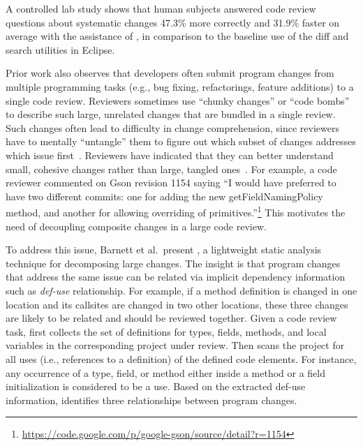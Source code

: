 \documentclass[11pt]{article}
\begin{document}

A controlled lab study shows that human subjects answered code review questions about systematic changes 47.3\% more correctly and 31.9\% faster on average with the assistance of {\critics}, in comparison to the baseline use of the diff and search utilities in Eclipse.

Prior work also observes that developers often submit program changes from multiple programming tasks (e.g., bug fixing, refactorings, feature additions) to a single code review. Reviewers sometimes use ``chunky changes'' or ``code bombs'' to describe such large, unrelated changes that are bundled in a single review. Such changes often lead to difficulty in change comprehension, since reviewers have to mentally ``untangle'' them to figure out which subset of changes addresses which issue first~\cite{kawrykow2011non, murphy2012we, herzig2013impact}. Reviewers have indicated that they can better understand small, cohesive changes rather than large, tangled ones~\cite{rigby2008open}. For example, a code reviewer commented on Gson revision 1154 saying ``I would have preferred to have two different commits: one for adding the new {\ttt getFieldNamingPolicy} method, and another for allowing overriding of primitives.''\footnote{\url{https://code.google.com/p/google-gson/source/detail?r=1154}} This motivates the need of decoupling composite changes in a large code review. 

To address this issue, Barnett et al.~present {\clusterchanges}, a lightweight static analysis technique for decomposing large changes. The insight is that program changes that address the same issue can be related via implicit dependency information such as {\em def-use} relationship. For example, if a method definition is changed in one location and its callsites are changed in two other locations, these three changes are likely to be related and should be reviewed together. Given a code review task, {\clusterchanges} first collects the set of definitions for types, fields, methods, and local variables in the corresponding project under review. Then {\clusterchanges} scans the project for all uses (i.e., references to a definition) of the defined code elements. For instance, any occurrence of a type, field, or method either inside a method or a field initialization is considered to be a use. Based on the extracted def-use information, {\clusterchanges} identifies three relationships between program changes. 
\end{document}
